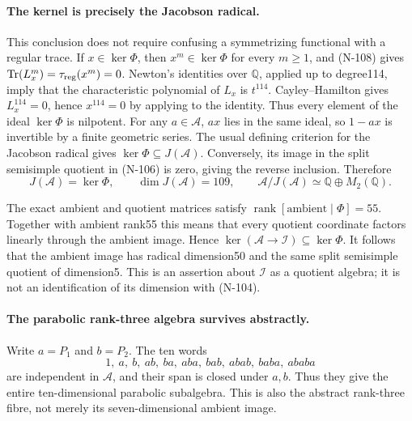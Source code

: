 \paragraph{The kernel is precisely the Jacobson radical.}
This conclusion does not require confusing a symmetrizing
functional with a regular trace.  If $x\in\ker\Phi$, then
$x^m\in\ker\Phi$ for every $m\ge1$, and (N-108) gives
$\operatorname{Tr}(L_x^m)=\tau_{\rm reg}(x^m)=0$.
Newton's identities over $\mathbb Q$, applied up to degree114,
imply that the characteristic polynomial of $L_x$ is $t^{114}$.
Cayley--Hamilton gives $L_x^{114}=0$, hence $x^{114}=0$ by
applying to the identity.  Thus every element of the ideal
$\ker\Phi$ is nilpotent.  For any $a\in\mathcal A$, $ax$
lies in the same ideal, so $1-ax$ is invertible by a finite
geometric series.  The usual defining criterion for the
Jacobson radical gives $\ker\Phi\subseteq J(\mathcal A)$.
Conversely, its image in the split semisimple quotient in
(N-106) is zero, giving the reverse inclusion.  Therefore
\[
 J(\mathcal A)=\ker\Phi,\qquad
 \dim J(\mathcal A)=109,\qquad
 \mathcal A/J(\mathcal A)\simeq\mathbb Q\oplus M_2(\mathbb Q).
 \tag{N-109}
\]

The exact ambient and quotient matrices satisfy
$\operatorname{rank}[\mathrm{ambient}\mid\Phi]=55$.
Together with ambient rank55 this means that every quotient
coordinate factors linearly through the ambient image.
Hence $\ker(\mathcal A\to\mathcal I)\subseteq\ker\Phi$.
It follows that the ambient image has radical dimension50
and the same split semisimple quotient of dimension5.
This is an assertion about $\mathcal I$ as a quotient algebra;
it is not an identification of its dimension with (N-104).

\paragraph{The parabolic rank-three algebra survives abstractly.}
Write $a=P_1$ and $b=P_2$.  The ten words
\[
 1,\ a,\ b,\ ab,\ ba,\ aba,\ bab,\ abab,\ baba,\ ababa
 \tag{N-110}
\]
are independent in $\mathcal A$, and their span is closed under
$a,b$.  Thus they give the entire ten-dimensional parabolic
subalgebra.  This is also the abstract rank-three fibre, not
merely its seven-dimensional ambient image.

